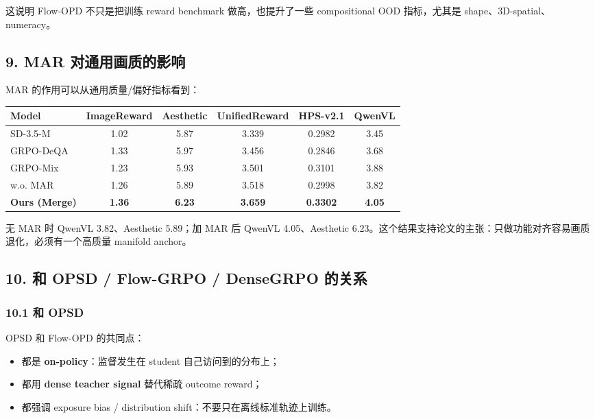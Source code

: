 这说明 Flow-OPD 不只是把训练 reward benchmark 做高，也提升了一些 compositional OOD 指标，尤其是 shape、3D-spatial、numeracy。

\subsection{9. MAR 对通用画质的影响}

MAR 的作用可以从通用质量/偏好指标看到：

\begin{center}
\small
\setlength{\tabcolsep}{4pt}
\begin{tabular}{lccccc}
\toprule
\textbf{Model} & \textbf{ImageReward} & \textbf{Aesthetic} & \textbf{UnifiedReward} & \textbf{HPS-v2.1} & \textbf{QwenVL} \\
\midrule
SD-3.5-M & 1.02 & 5.87 & 3.339 & 0.2982 & 3.45 \\
GRPO-DeQA & 1.33 & 5.97 & 3.456 & 0.2846 & 3.68 \\
GRPO-Mix & 1.23 & 5.93 & 3.501 & 0.3101 & 3.88 \\
w.o. MAR & 1.26 & 5.89 & 3.518 & 0.2998 & 3.82 \\
\textbf{Ours (Merge)} & \textbf{1.36} & \textbf{6.23} & \textbf{3.659} & \textbf{0.3302} & \textbf{4.05} \\
\bottomrule
\end{tabular}
\end{center}

无 MAR 时 QwenVL 3.82、Aesthetic 5.89；加 MAR 后 QwenVL 4.05、Aesthetic 6.23。这个结果支持论文的主张：只做功能对齐容易画质退化，必须有一个高质量 manifold anchor。

\subsection{10. 和 OPSD / Flow-GRPO / DenseGRPO 的关系}

\subsubsection{10.1 和 OPSD}

OPSD 和 Flow-OPD 的共同点：

\begin{itemize}[leftmargin=1.5em]
  \item 都是 \textbf{on-policy}：监督发生在 student 自己访问到的分布上；
  \item 都用 \textbf{dense teacher signal} 替代稀疏 outcome reward；
  \item 都强调 exposure bias / distribution shift：不要只在离线标准轨迹上训练。
\end{itemize}

